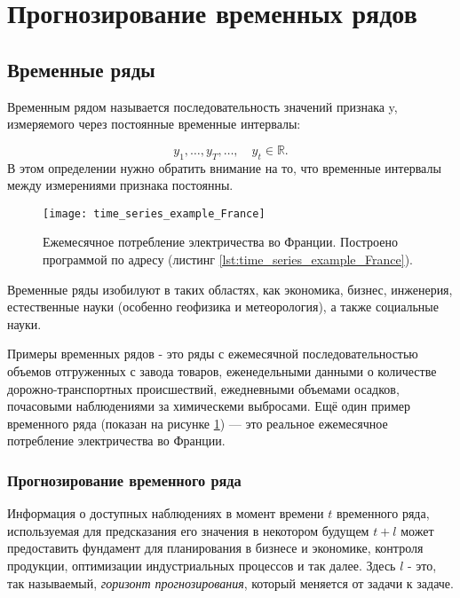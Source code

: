 \section{Прогнозирование временных рядов}

\subsection{Временные ряды}

Временным рядом называется последовательность значений признака y, измеряемого 
через постоянные временные интервалы:

\begin{equation*}
    y_1, \dots, y_T, \dots, \quad y_t \in \mathbb{R}.
\end{equation*}
В этом определении нужно обратить внимание на то, что временные интервалы между 
измерениями признака постоянны.\\[-0.5em]

\begin{figure}[h!]
    \centering
    \texttt{[image: time\_series\_example\_France]}
    \caption{Ежемесячное потребление электричества во Франции. 
    Построено программой по адресу (листинг \ref{lst:time_series_example_France}).}
    \label{fig:time_series_example_France}
\end{figure}

Временные ряды изобилуют в таких
областях, как экономика, бизнес, инженерия, естественные науки 
(особенно геофизика и метеорология), а также социальные науки.

Примеры временных рядов - это ряды с  
ежемесячной последовательностью объемов отгруженных с завода товаров, 
еженедельными данными о количестве дорожно-транспортных происшествий, 
ежедневными объемами осадков, почасовыми наблюдениями за химическеми 
выбросами. Ещё один пример временного ряда 
(показан на рисунке \ref{fig:time_series_example_France}) — это реальное 
ежемесячное потребление электричества во Франции.

\subsubsection{Прогнозирование временного ряда \cite{TSA_Box}}

Информация о доступных наблюдениях в момент времени $t$ временного ряда, 
используемая для предсказания его значения в некотором будущем $t+l$ может 
предоставить фундамент для планирования в бизнесе и экономике, контроля продукции, 
оптимизации индустриальных процессов и так далее. Здесь $l$ - это, так называемый, 
\textit{горизонт прогнозирования}, который меняется от задачи к задаче.

